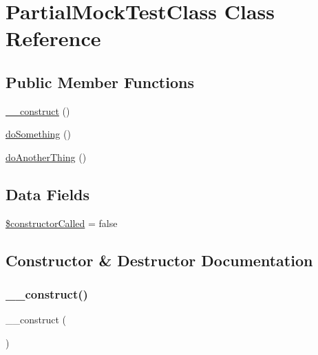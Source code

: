 \hypertarget{class_partial_mock_test_class}{}\section{Partial\+Mock\+Test\+Class Class Reference}
\label{class_partial_mock_test_class}
\subsection*{Public Member Functions}
\begin{DoxyCompactItemize}
\item 
\mbox{\hyperlink{class_partial_mock_test_class_a095c5d389db211932136b53f25f39685}{\+\_\+\+\_\+construct}} ()
\item 
\mbox{\hyperlink{class_partial_mock_test_class_abe91a8abe16159c0096d570ee6ccc985}{do\+Something}} ()
\item 
\mbox{\hyperlink{class_partial_mock_test_class_a90ab9ff1870132647ac623e373801c67}{do\+Another\+Thing}} ()
\end{DoxyCompactItemize}
\subsection*{Data Fields}
\begin{DoxyCompactItemize}
\item 
\mbox{\hyperlink{class_partial_mock_test_class_a26b97713c7ee0e73aea8662209e002d8}{\$constructor\+Called}} = false
\end{DoxyCompactItemize}


\subsection{Constructor \& Destructor Documentation}
\mbox{\label{class_partial_mock_test_class_a095c5d389db211932136b53f25f39685}} 
\subsubsection{\texorpdfstring{\+\_\+\+\_\+construct()}{\_\_construct()}}
{\footnotesize\ttfamily \+\_\+\+\_\+construct (\begin{DoxyParamCaption}{ }\end{DoxyParamCaption})}



